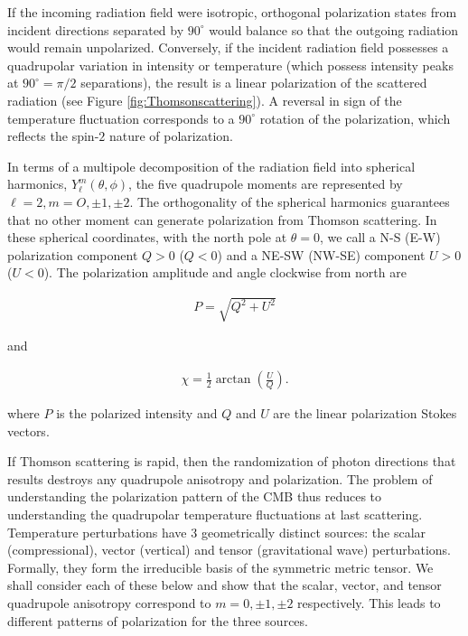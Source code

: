 \documentclass[a4paper,11pt]{article}
\begin{document}
{\noindent}If the incoming radiation field were isotropic, orthogonal polarization states from incident directions separated by $90^\circ$ would balance so that the outgoing radiation would remain unpolarized. Conversely, if the incident radiation field possesses a quadrupolar variation in intensity or temperature (which possess intensity peaks at $90^\circ=\pi/2$ separations), the result is a linear polarization of the scattered radiation (see Figure \ref{fig:Thomsonscattering}). A reversal in sign of the temperature fluctuation corresponds to a $90^\circ$ rotation of the polarization, which reflects the spin-$2$ nature of polarization.

{\noindent}In terms of a multipole decomposition of the radiation field into spherical harmonics, $Y_\ell^m(\theta,\phi)$, the five quadrupole moments are represented by $\ell= 2, m=O,\pm1,\pm2$. The orthogonality of the spherical harmonics guarantees that no other moment can generate polarization from Thomson scattering. In these spherical coordinates, with the north pole at $\theta=0$, we call a N-S (E-W) polarization component $Q>0$ ($Q<0$) and a NE-SW (NW-SE) component $U>0$ ($U<0$). The polarization amplitude and angle clockwise from north are

\begin{align*}
    P = \sqrt{Q^2+U^2}
\end{align*}

{\noindent}and

\begin{align*}
    \chi = \frac{1}{2}\arctan\left(\frac{U}{Q}\right).
\end{align*}

{\noindent}where $P$ is the polarized intensity and $Q$ and $U$ are the linear polarization Stokes vectors.

{\noindent}If Thomson scattering is rapid, then the randomization of photon directions that results destroys any quadrupole anisotropy and polarization. The problem of understanding the polarization pattern of the CMB thus reduces to understanding the quadrupolar temperature fluctuations at last scattering. Temperature perturbations have 3 geometrically distinct sources: the scalar (compressional), vector (vertical) and tensor (gravitational wave) perturbations. Formally, they form the irreducible basis of the symmetric metric tensor. We shall consider each of these below and show that the scalar, vector, and tensor quadrupole anisotropy correspond to $m=0,\pm1,\pm2$ respectively. This leads to different patterns of polarization for the three sources.
\end{document}
